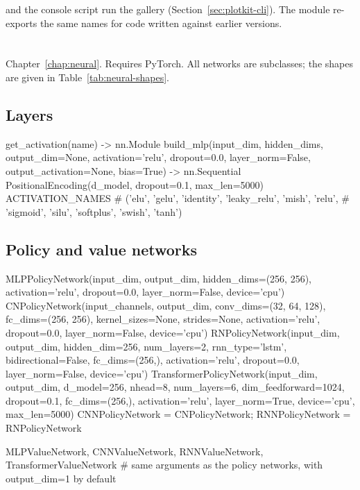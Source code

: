  and the console script
 run the gallery (Section~\ref{sec:plotkit-cli}). The
module  re-exports the same names for code written
against earlier versions.

\section{\texorpdfstring{}{toolkit.neural\_toolkit}}\label{sec:api-neural}

Chapter~\ref{chap:neural}. Requires PyTorch. All networks are
 subclasses; the shapes are given in
Table~\ref{tab:neural-shapes}.

\subsection{Layers}

\begin{pycode}
get_activation(name) -> nn.Module
build_mlp(input_dim, hidden_dims, output_dim=None, activation='relu',
          dropout=0.0, layer_norm=False, output_activation=None,
          bias=True) -> nn.Sequential
PositionalEncoding(d_model, dropout=0.1, max_len=5000)
ACTIVATION_NAMES   # ('elu', 'gelu', 'identity', 'leaky_relu', 'mish', 'relu',
                   #  'sigmoid', 'silu', 'softplus', 'swish', 'tanh')
\end{pycode}

\subsection{Policy and value networks}

\begin{pycode}
MLPPolicyNetwork(input_dim, output_dim, hidden_dims=(256, 256),
                 activation='relu', dropout=0.0, layer_norm=False, device='cpu')
CNPolicyNetwork(input_channels, output_dim, conv_dims=(32, 64, 128),
                fc_dims=(256, 256), kernel_sizes=None, strides=None,
                activation='relu', dropout=0.0, layer_norm=False, device='cpu')
RNPolicyNetwork(input_dim, output_dim, hidden_dim=256, num_layers=2,
                rnn_type='lstm', bidirectional=False, fc_dims=(256,),
                activation='relu', dropout=0.0, layer_norm=False, device='cpu')
TransformerPolicyNetwork(input_dim, output_dim, d_model=256, nhead=8,
                         num_layers=6, dim_feedforward=1024, dropout=0.1,
                         fc_dims=(256,), activation='relu', layer_norm=True,
                         device='cpu', max_len=5000)
CNNPolicyNetwork = CNPolicyNetwork; RNNPolicyNetwork = RNPolicyNetwork

MLPValueNetwork, CNNValueNetwork, RNNValueNetwork, TransformerValueNetwork
    # same arguments as the policy networks, with output_dim=1 by default
\end{pycode}

